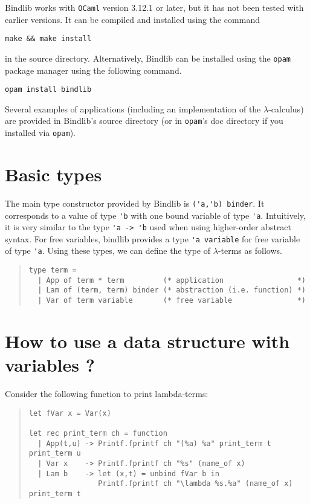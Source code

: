 \documentclass[11pt]{article}
\begin{document}
Bindlib works with \verb#OCaml# version 3.12.1 or later, but it has not been
tested with earlier versions. It can be compiled and installed using the
command
\begin{center}
  \verb#make && make install#
\end{center}
in the source directory. Alternatively, Bindlib can be installed using the
\verb#opam# package manager using the following command.
\begin{center}
  \verb#opam install bindlib#
\end{center}

Several examples of applications (including an implementation of the
$\lambda$-calculus) are provided in Bindlib's source directory (or in
\verb#opam#'s doc directory if you installed via \verb#opam#).

\section{Basic types}

The main type constructor provided by Bindlib is \verb#('a,'b) binder#. It
corresponds to a value of type \verb#'b# with one bound variable of type
\verb#'a#. Intuitively, it is very similar to the type \verb#'a -> 'b# used
when using higher-order abstract syntax. For free variables, bindlib provides
a type \verb#'a variable# for free variable of type \verb#'a#. Using these
types, we can define the type of $\lambda$-terms as follows.
\begin{quote}
\begin{verbatim}
type term =
  | App of term * term         (* application                 *)
  | Lam of (term, term) binder (* abstraction (i.e. function) *)
  | Var of term variable       (* free variable               *)
\end{verbatim}
\end{quote}

\section{How to use a data structure with variables ?}

Consider the following function to print lambda-terms:

\begin{quote}
\begin{verbatim}
let fVar x = Var(x)

let rec print_term ch = function
  | App(t,u) -> Printf.fprintf ch "(%a) %a" print_term t print_term u
  | Var x    -> Printf.fprintf ch "%s" (name_of x)
  | Lam b    -> let (x,t) = unbind fVar b in
                Printf.fprintf ch "\lambda %s.%a" (name_of x) print_term t
\end{verbatim}
\end{quote}
\end{document}
